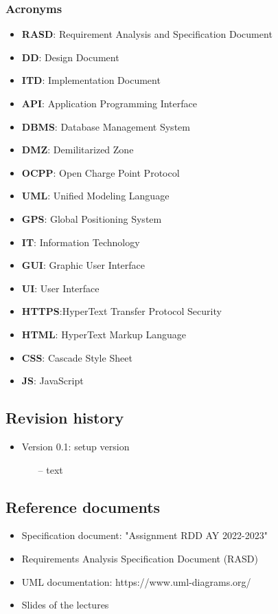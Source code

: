 \documentclass[table, 12pt]{article}
\begin{document}
\subsubsection*{Acronyms}
\begin{itemize}
    \item \textbf{RASD}: Requirement Analysis and Specification Document
    \item \textbf{DD}: Design Document
    \item \textbf{ITD}: Implementation Document
    \item \textbf{API}: Application Programming Interface
    \item \textbf{DBMS}: Database Management System
    \item \textbf{DMZ}: Demilitarized Zone
    \item \textbf{OCPP}: Open Charge Point Protocol
    \item \textbf{UML}: Unified Modeling Language
    \item \textbf{GPS}: Global Positioning System
    \item \textbf{IT}: Information Technology
    \item \textbf{GUI}: Graphic User Interface
    \item \textbf{UI}: User Interface
    \item \textbf{HTTPS}:HyperText Transfer Protocol Security
    \item \textbf{HTML}: HyperText Markup Language
    \item \textbf{CSS}: Cascade Style Sheet
    \item \textbf{JS}: JavaScript
\end{itemize}

\subsection{Revision history}
\begin{itemize}
    \item Version 0.1: setup version
    \begin{itemize}
        \item[--] text 
    \end{itemize}
\end{itemize}

\subsection{Reference documents}
\begin{itemize}
    \item Specification document: "Assignment RDD AY 2022-2023"
    \item Requirements Analysis Specification Document (RASD)
    \item UML documentation: https://www.uml-diagrams.org/
    \item Slides of the lectures
\end{itemize}
\end{document}
